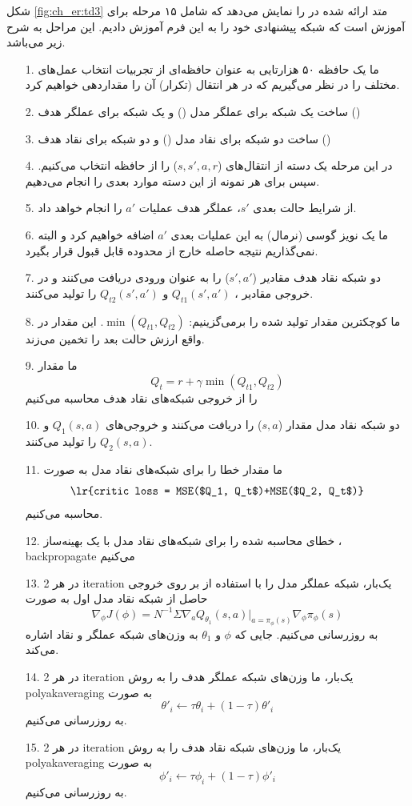شکل \ref{fig:ch_er:td3} متد ارائه شده در \cite{fujimoto2018addressing} را نمایش می‌دهد که شامل ۱۵ مرحله برای آموزش است که شبکه پیشنهادی خود را به این فرم آموزش دادیم. این مراحل به شرح زیر می‌باشد.
\begin{itemize}
	\item[1.]
ما یک حافظه ۵۰ هزارتایی به عنوان حافظه‌ای از تجربیات انتخاب عمل‌های مختلف را در نظر می‌گیریم که در هر انتقال (تکرار) آن را مقداردهی خواهیم کرد.
\item[2.]
ساخت یک شبکه برای عملگر مدل () و یک شبکه برای عملگر هدف ()
\item[3.]
ساخت دو شبکه برای نقاد مدل () و دو شبکه برای نقاد هدف ()
	
\item[4.]
در این مرحله یک دسته از انتقال‌های ($s, s', a, r$) را از حافظه انتخاب می‌کنیم. سپس برای هر نمونه از این دسته موارد بعدی را انجام می‌دهیم.
\item[5.]
از شرایط حالت بعدی $s'$، عملگر هدف عملیات $a'$ را انجام خواهد داد.
\item[6.]
ما یک نویز گوسی (نرمال) به این عملیات بعدی $a'$ اضافه خواهیم کرد و البته نمی‌گذاریم نتیجه حاصله خارج از محدوده قابل قبول قرار بگیرد.
\item[7.]
دو شبکه نقاد هدف مقادیر ($s',a'$) را به عنوان ورودی دریافت می‌کنند و در خروجی مقادیر
 ، 
$Q_{t1}(s',a')$
 و
 $Q_{t2}(s',a')$
  را تولید می‌کنند.
\item[8.]
ما کوچکترین مقدار  تولید شده را برمی‌گزینیم: $\min(Q_{t1}, Q_{t2})$. این مقدار در واقع ارزش حالت بعد را تخمین می‌زند.
\item[9.]
ما مقدار
$$Q_t=r+\gamma\min(Q_{t1}, Q_{t2})$$
 را از خروجی شبکه‌های نقاد هدف محاسبه می‌کنیم
\item[10.]
دو شبکه نقاد مدل مقدار ($s,a$) را دریافت می‌کنند و خروجی‌های 
$Q_1(s,a)$ و $Q_2(s,a)$
 را تولید می‌کنند.
\item[11.]
ما مقدار خطا را برای شبکه‌های نقاد مدل به صورت
$$\text{\lr{critic loss = MSE($Q_1, Q_t$)+MSE($Q_2, Q_t$)}}$$
 محاسبه می‌کنیم.
\item[12.]
خطای محاسبه شده را برای شبکه‌های نقاد مدل با یک بهینه‌ساز ، \gls{backpropagate} می‌کنیم
\item[13.]
در هر 2 \gls{iteration} یک‌بار، شبکه عملگر مدل را با استفاده از  بر روی خروجی حاصل از شبکه نقاد مدل اول به صورت
$$\nabla_{\phi}J(\phi)=N^{-1}\Sigma\nabla_aQ_{\theta_1}(s,a)|_{a=\pi_\phi(s)}\nabla_\phi\pi_\phi(s)$$
به روزرسانی می‌کنیم. جایی که $\phi$ و $\theta_1$ به وزن‌های شبکه عملگر و نقاد اشاره می‌کند.
\item[14.]
در هر 2 \gls{iteration} یک‌بار، ما وزن‌های شبکه عملگر هدف را به روش \gls{polyakaveraging} به صورت 
$$\theta'_i \leftarrow \tau\theta_i+(1-\tau)\theta'_i$$
به روزرسانی می‌کنیم.
\item[15.]
در هر 2 \gls{iteration} یک‌بار، ما وزن‌های شبکه نقاد هدف را به روش \gls{polyakaveraging} به صورت 
$$\phi'_i \leftarrow \tau\phi_i+(1-\tau)\phi'_i$$
 به روزرسانی می‌کنیم.
\end{itemize}


